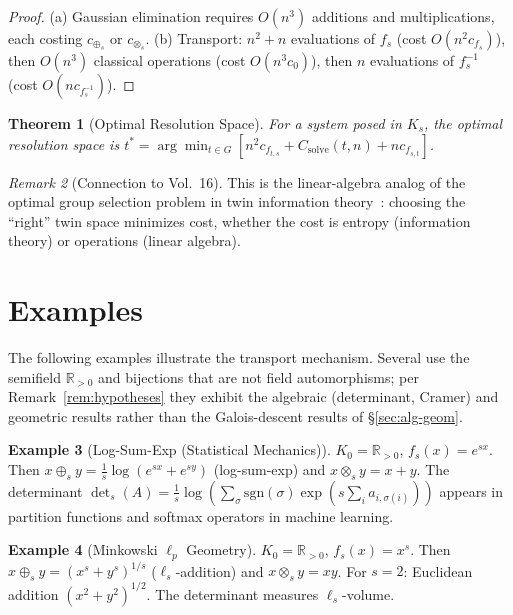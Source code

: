 \documentclass[11pt,twocolumn]{article}
\theoremstyle{plain}
\newtheorem{theorem}{Theorem}
\theoremstyle{definition}
\newtheorem{example}[theorem]{Example}
\theoremstyle{remark}
\newtheorem{remark}[theorem]{Remark}
\begin{document}
\begin{proof}
(a) Gaussian elimination requires $O(n^3)$ additions and multiplications, each costing $c_{\oplus_s}$ or $c_{\otimes_s}$.
(b) Transport: $n^2 + n$ evaluations of $f_s$ (cost $O(n^2 c_{f_s})$), then $O(n^3)$ classical operations (cost $O(n^3 c_0)$), then $n$ evaluations of $f_s^{-1}$ (cost $O(n c_{f_s^{-1}})$).
\end{proof}

\begin{theorem}[Optimal Resolution Space]\label{thm:optimal-space}
For a system posed in $K_s$, the optimal resolution space is $t^* = \arg\min_{t \in G}[n^2 c_{f_{t,s}} + C_{\mathrm{solve}}(t, n) + n c_{f_{s,t}}]$.
\end{theorem}

\begin{remark}[Connection to Vol.~16]
This is the linear-algebra analog of the optimal group selection problem in twin information theory~\cite{nembe2026vol16,nembe2026a2}: choosing the ``right'' twin space minimizes cost, whether the cost is entropy (information theory) or operations (linear algebra).
\end{remark}


\section{Examples}
\label{sec:examples}

The following examples illustrate the transport mechanism. Several use the semifield $\mathbb{R}_{>0}$ and bijections that are not field automorphisms; per Remark~\ref{rem:hypotheses} they exhibit the algebraic (determinant, Cramer) and geometric results rather than the Galois-descent results of \S\ref{sec:alg-geom}.

\begin{example}[Log-Sum-Exp (Statistical Mechanics)]\label{ex:logsumexp}
$K_0 = \mathbb{R}_{>0}$, $f_s(x) = e^{sx}$. Then $x \oplus_s y = \frac{1}{s}\log(e^{sx} + e^{sy})$ (log-sum-exp) and $x \otimes_s y = x + y$. The determinant $\det_s(A) = \frac{1}{s}\log(\sum_\sigma \mathrm{sgn}(\sigma) \exp(s \sum_i a_{i,\sigma(i)}))$ appears in partition functions and softmax operators in machine learning.
\end{example}

\begin{example}[Minkowski $\ell_p$ Geometry]\label{ex:minkowski}
$K_0 = \mathbb{R}_{>0}$, $f_s(x) = x^s$. Then $x \oplus_s y = (x^s + y^s)^{1/s}$ ($\ell_s$-addition) and $x \otimes_s y = xy$. For $s = 2$: Euclidean addition $(x^2 + y^2)^{1/2}$. The determinant measures $\ell_s$-volume.
\end{example}
\end{document}
